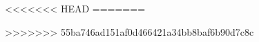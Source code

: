 
\newcommand{\quizheader}{ {\large NAME: \hskip 3in SID:\hfill}
                                \newline\lineacross \medskip }



\newcommand{\namespace}{\noindent{\Large NAME: \hfill SID:\hskip 1.5in\ }\\\medskip\noindent\mbox{}\hrulefill\mbox{}}

<<<<<<< HEAD
=======



\newtheorem{theorem}{Theorem}[section]
\newtheorem{definition}[theorem]{Definition}
\newtheorem{corollary}[theorem]{Corollary}
\newtheorem{lemma}[theorem]{Lemma}
\newtheorem{fact}[theorem]{Fact}
\newtheorem{claim}[theorem]{Claim}

\newenvironment{proof}{{\it Proof:\/}}{$\Box$\vskip 0.1in}

>>>>>>> 55ba746ad151af0d466421a34bb8baf6b90d7c8c
